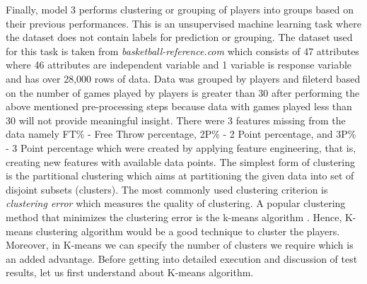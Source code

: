\documentclass[format=sigconf]{acmart}
\begin{document}
Finally, model 3 performs clustering or grouping of players into groups based on their previous performances. This is an unsupervised
machine learning task where the dataset does not contain labels for prediction or grouping. The dataset used for this task is taken from 
\textit{basketball-reference.com} which consists of 47 attributes where 46 attributes are independent variable and 1 variable is 
response variable and has over 28,000 rows of data. Data was grouped by players and fileterd based on the number of games played by players 
is greater than 30 after performing the above mentioned pre-processing steps because data with games played less than 30 will not provide 
meaningful insight. There were 3 features missing from the data namely FT\% - Free Throw percentage, 2P\% - 2 Point percentage, and
3P\% - 3 Point percentage which were created by applying feature engineering, that is, creating new features with available data 
points. The simplest form of clustering is the partitional clustering which aims at partitioning the given data into set of disjoint
subsets (clusters). The most commonly used clustering criterion is \textit{clustering error} which measures the quality of clustering.
A popular clustering method that minimizes the clustering error is the k-means algorithm \cite{likas2003global}. Hence, K-means 
clustering algorithm would be a good technique to cluster the players. Moreover, in K-means we can specify the number of clusters 
we require which is an added advantage. Before getting into detailed execution and discussion of test results, let us first understand about 
K-means algorithm.
\end{document}
